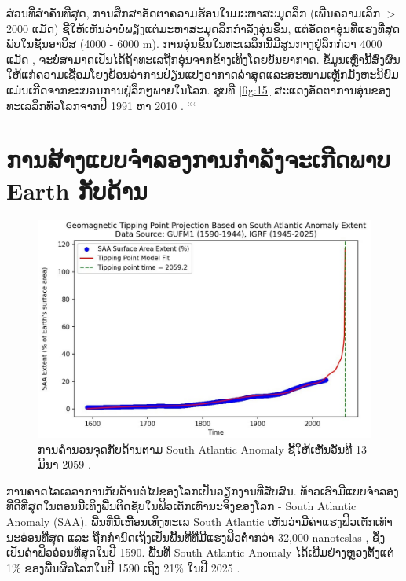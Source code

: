 \documentclass[10pt,twocolumn,letterpaper]{article}
\begin{document}
ສ່ວນທີ່ສຳຄັນທີ່ສຸດ, ການສຶກສາອັດຕາຄວາມຮ້ອນໃນມະຫາສະມຸດລຶກ (ເພີ່ນຄວາມເລິກ $>$2000 ແມັດ) ຊີ້ໃຫ້ເຫັນວ່າບໍ່ພຽງແຕ່ມະຫາສະມຸດລຶກກຳລັງອຸ່ນຂຶ້ນ, ແຕ່ອັດຕາອຸ່ນທີ່ແຮງທີ່ສຸດພົບໃນຊັ້ນອາບິສ (4000 - 6000 m). ການອຸ່ນຂຶ້ນໃນທະເລລຶກນີ້ມີສູນກາງຢູ່ລຶກກ່ວາ 4000 ແມັດ \cite{132,129}, ຈະບໍ່ສາມາດເປັນໄດ້ຖ້າທະເລຖືກອຸ່ນຈາກຂ້າງເທິງໂດຍບັນຍາກາດ. ຂໍ້ມູນເຫຼົ່ານີ້ສົ່ງຜົນໃຫ້ແກ່ຄວາມເຊື່ອມໂຍງຢ້ອນວ່າການປ່ຽນແປງອາກາດລ່າສຸດແລະສະໜາມເຫຼັກມັງຫະນິຍົມແມ່ນເກີດຈາກຂະບວນການຢູ່ລຶກໆພາຍໃນໂລກ. ຮູບທີ່ \ref{fig:15} ສະແດງອັດຕາການອຸ່ນຂອງທະເລລຶກທົ່ວໂລກຈາກປີ 1991 ຫາ 2010 \cite{132}.
```
\section{ການສ້າງແບບຈຳລອງການກຳລັງຈະເກີດພາບ Earth ກັບດ້ານ}

\begin{figure}[b]
\begin{center}
   \includegraphics[width=1\linewidth]{saa-crop.jpeg}
\end{center}
   \caption{ການຄຳນວນຈຸດກັບດ້ານຕາມ South Atlantic Anomaly ຊີ້ໃຫ້ເຫັນວັນທີ 13 ມີນາ 2059 \cite{125,126}.}
\label{fig:16}
\label{fig:onecol}
\end{figure}

ການຄາດໄລເວລາການກັບດ້ານຕໍ່ໄປຂອງໂລກເປັນວຽກງານທີ່ສັບສົນ. ທ້າວເຮົາມີແບບຈຳລອງທີ່ດີທີ່ສຸດໃນຕອນນີ້ເທິງພື້ນຕິດຊັບໃນຟິວເຕັກເທົານະຈິງຂອງໂລກ - South Atlantic Anomaly (SAA). ພື້ນທີ່ນີ້ເຫື້ອນເທິງທະເລ South Atlantic ເຫັນວ່າມີຄ່າແຮງຟິວເຕັກເທົານະອ່ອນທີ່ສຸດ ແລະ ຖືກກຳນົດເຖິງເປັນພື້ນທີ່ທີ່ມີແຮງຟິວຕໍ່າກວ່າ 32,000 nanoteslas \cite{135}, ຊຶ່ງເປັນຄ່າຟິວອ່ອນທີ່ສຸດໃນປີ 1590. ພື້ນທີ່ South Atlantic Anomaly ໄດ້ເພີ່ມຢ່າງຫຼວງຕັ້ງແຕ່ 1\% ຂອງພື້ນຜິວໂລກໃນປີ 1590 ເຖິງ 21\% ໃນປີ 2025 \cite{136}.
\end{document}
